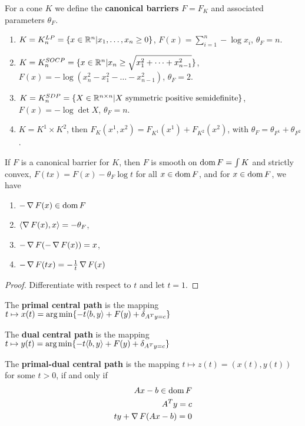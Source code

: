 \begin{defn}
  \label{sec:inter-point-meth-1}
  For a cone $K$ we define the \textbf{canonical barriers} $F = F_{K}$
  and associated parameters $\theta_{F}$.
  \begin{enumerate}
  \item $K = K^{LP}_{n} = \{ x \in \mathbb{R}^{n} | x_{1}, \dots, x_{n} \geq 0
    \} $, $F(x) = \sum_{i=1}^{n} -\log x_{i}$, $\theta_{F} = n$.
  \item $K = K_{n}^{SOCP} = \{ x \in \mathbb{R}^{n} | x_{n} \geq
    \sqrt{x_{1}^{2} + \cdots + x_{n-1}^{2}}\}$, $F(x) =
    -\log(x_{n}^{2} - x_{1}^{2} - \dots - x_{n-1}^{2})$, $\theta_{F} =
    2$.
  \item $K = K_{n}^{SDP} = \{ X \in \mathbb{R}^{n \times n} | \text{$X$
      symmetric positive semidefinite} \}$, $F(x) = - \log \det X$,
    $\theta_{F} = n$.
  \item $K = K^{1} \times K^{2}$, then $F_{K}(x^{1}, x^{2}) =
    F_{K^{1}}(x^{1}) + F_{K^{2}}(x^{2})$, with $\theta_{F} =
    \theta_{F^{1}} + \theta_{F^{2}}$.
  \end{enumerate}
\end{defn}

\begin{thm}
  \label{sec:inter-point-meth-2}
  If $F$ is a canonical barrier for $K$, then $F$ is smooth on $\operatorname*{dom} F
  = \int K$ and strictly convex, $F(tx) = F(x) - \theta_{F} \log t$
  for all  $x \in \operatorname*{dom} F$, and for $x \in \operatorname*{dom} F$, we have
  \begin{enumerate}
  \item $- \operatorname*{\nabla} F(x) \in \operatorname*{dom} F$
  \item $\IP{\grad F(x), x} = - \theta_{F}$,
  \item $-\operatorname*{\nabla} F(-\operatorname*{\nabla} F(x)) = x$,
  \item $-\operatorname*{\nabla} F(tx) = -\frac{1}{t} \operatorname*{\nabla} F(x)$
  \end{enumerate}
\end{thm}

\begin{proof}
  Differentiate with respect to $t$ and let $t = 1$.
\end{proof}

\begin{thm}
  \label{sec:inter-point-meth-3}
  The \textbf{primal central path} is the mapping $t \mapsto x(t) =
  \argmin \{ -t \IP{b, y} + F(y) + \delta_{A^{T}y = c} \} $

  The \textbf{dual central path} is the mapping $t \mapsto y(t) =
  \argmin \{ -t \IP{b, y} + F(y) + \delta_{A^{T}y = c} \} $

  The \textbf{primal-dual central path} is the mapping $t \mapsto z(t)
  = (x(t), y(t))$ for some $t > 0$, if and only if
  \begin{align}
    \label{eq:52}
    Ax - b \in \operatorname*{dom} F \\
    \label{eq:53}
    A^{T} y = c \\
    \label{eq:54}
    ty + \operatorname*{\nabla} F(Ax - b) = 0
  \end{align}
\end{thm}

